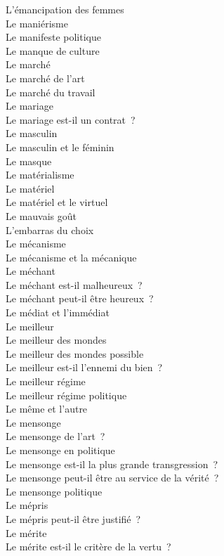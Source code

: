\documentclass[a4paper,12pt]{article}
\begin{document}
L'émancipation des femmes \\
Le maniérisme \\
Le manifeste politique \\
Le manque de culture \\
Le marché \\
Le marché de l'art \\
Le marché du travail \\
Le mariage \\
Le mariage est-il un contrat ? \\
Le masculin \\
Le masculin et le féminin \\
Le masque \\
Le matérialisme \\
Le matériel \\
Le matériel et le virtuel \\
Le mauvais goût \\
L'embarras du choix \\
Le mécanisme \\
Le mécanisme et la mécanique \\
Le méchant \\
Le méchant est-il malheureux ? \\
Le méchant peut-il être heureux ? \\
Le médiat et l'immédiat \\
Le meilleur \\
Le meilleur des mondes \\
Le meilleur des mondes possible \\
Le meilleur est-il l'ennemi du bien ? \\
Le meilleur régime \\
Le meilleur régime politique \\
Le même et l'autre \\
Le mensonge \\
Le mensonge de l'art ? \\
Le mensonge en politique \\
Le mensonge est-il la plus grande transgression ? \\
Le mensonge peut-il être au service de la vérité ? \\
Le mensonge politique \\
Le mépris \\
Le mépris peut-il être justifié ? \\
Le mérite \\
Le mérite est-il le critère de la vertu ? \\
\end{document}
